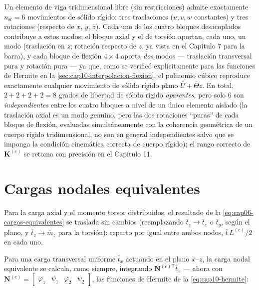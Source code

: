 \begin{observacion}
Un elemento de viga tridimensional libre (sin restricciones) admite exactamente $n_{\text{sr}}=6$ movimientos de sólido rígido: tres traslaciones ($u,v,w$ constantes) y tres rotaciones (respecto de $x$, $y$, $z$). Cada uno de los cuatro bloques desacoplados contribuye a estos modos: el bloque axial y el de torsión aportan, cada uno, un modo (traslación en $z$; rotación respecto de $z$, ya vista en el Capítulo 7 para la barra), y cada bloque de flexión $4\times4$ aporta \emph{dos} modos --- traslación transversal pura y rotación pura --- ya que, como se verificó explícitamente para las funciones de Hermite en la \cref{sec:cap10-interpolacion-flexion}, el polinomio cúbico reproduce exactamente cualquier movimiento de sólido rígido plano $\bar U+\bar\Theta z$. En total, $2+2+2+2=8$ grados de libertad de sólido rígido \emph{aparentes}, pero solo $6$ son \emph{independientes} entre los cuatro bloques a nivel de un único elemento aislado (la traslación axial es un modo genuino, pero las dos rotaciones ``puras'' de cada bloque de flexión, evaluadas simultáneamente con la coherencia geométrica de un cuerpo rígido tridimensional, no son en general independientes salvo que se imponga la condición cinemática correcta de cuerpo rígido); el rango correcto de $\bm K^{(e)}$ se retoma con precisión en el Capítulo 11.
\end{observacion}

\section{Cargas nodales equivalentes}
\label{sec:cap10-cargas-equivalentes}

Para la carga axial y el momento torsor distribuidos, el resultado de la \cref{eq:cap06-cargas-equivalentes} se traslada sin cambios (reemplazando $\bar t_z\to\bar t_x$ o $\bar t_y$, según el plano, y $\bar t_z\to\bar m_z$ para la torsión): reparto por igual entre ambos nodos, $\bar t\,L^{(e)}/2$ en cada uno.

Para una carga transversal uniforme $\bar t_x$ actuando en el plano $x$--$z$, la carga nodal equivalente se calcula, como siempre, integrando $\bm N^{(e)\mathsf T}\bar t_x$ --- ahora con $\bm N^{(e)}=\begin{bmatrix}\varphi_1&\psi_1&\varphi_2&\psi_2\end{bmatrix}$, las funciones de Hermite de la \cref{eq:cap10-hermite}:

